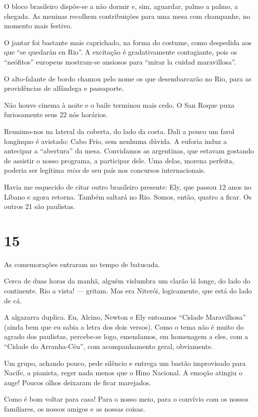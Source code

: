 O bloco brasileiro dispõe-se a não dormir e, sim, aguardar, palmo a palmo, a chegada. As meninas recolhem contribuições para uma mesa com champanhe, no momento mais festivo.

O jantar foi bastante mais caprichado, na forma do costume, como despedida aos que ``se quedarán en Rio''. A excitação é gradativamente contagiante, pois os ``neófitos'' europeus mostram-se ansiosos para ``mirar la cuidad maravillosa''.

O alto-falante de bordo chamou pelo nome os que desembarcarão no Rio, para as providências de alfândega e passaporte.

Não houve cinema à noite e o baile terminou mais cedo. O San Roque puxa furiosamente seus 22 nós horários.

Reunimo-nos na lateral da coberta, do lado da costa. Dali a pouco um farol longínquo é avistado: Cabo Frio, sem nenhuma dúvida. A euforia induz a antecipar a ``abertura'' da mesa. Convidamos as argentinas, que estavam gostando de assistir o nosso programa, a participar dele. Uma delas, morena perfeita, poderia ser legítima \textit{miss} de seu país nos concursos internacionais.

Havia me esquecido de citar outro brasileiro presente: Ely, que passou 12 anos no Líbano e agora retorna. Também saltará no Rio. Somos, então, quatro a ficar. Os outros 21 são paulistas.

\section*{15 \adfflatleafright {}}
As comemorações entraram no tempo de batucada.

Cerca de duas horas da manhã, alguém vislumbra um clarão lá longe, do lado do continente. Rio a vista! --- gritam. Mas era Niterói, logicamente, que está do lado de cá.

A algazarra duplica. Eu, Alcino, Newton e Ely entoamos ``Cidade Maravilhosa'' (ainda bem que eu sabia a letra dos dois versos). Como o tema não é muito do agrado dos paulistas, percebe-se logo, emendamos, em homenagem a eles, com a ``Cidade do Arranha-Céu'', com acompanhamento geral, obviamente.

Um grupo, achando pouco, pede silêncio e entrega um bastão improvisado para Nacife, a pianista, reger nada menos que o Hino Nacional. A emoção atingiu o auge! Poucos olhos deixaram de ficar marejados.

Como é bom voltar para casa! Para o nosso meio, para o convívio com os nossos familiares, os nossos amigos e as nossas coisas.

